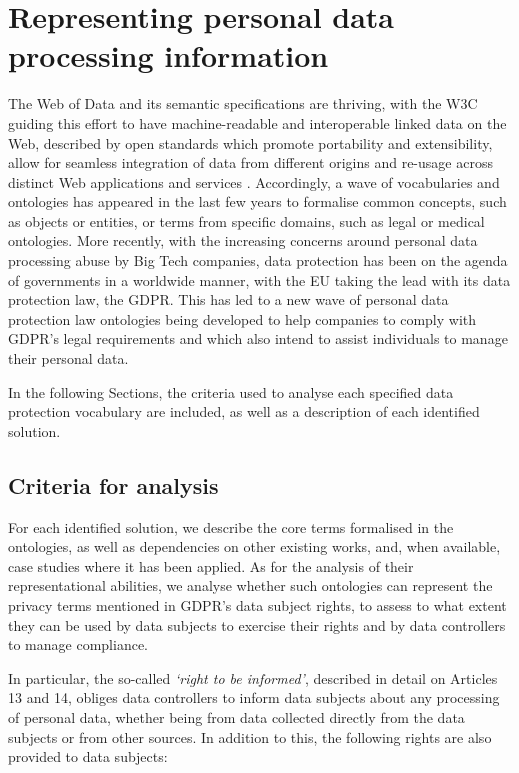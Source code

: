 \section{Representing personal data processing information}
\label{sec:sota_vocabularies}

The Web of Data and its semantic specifications are thriving, with the W3C guiding this effort to have machine-readable and interoperable linked data on the Web, described by open standards which promote portability and extensibility, allow for seamless integration of data from different origins and re-usage across distinct Web applications and services \citep{berners-lee_semantic_2001}.
Accordingly, a wave of vocabularies and ontologies has appeared in the last few years to formalise common concepts, such as objects or entities, or terms from specific domains, such as legal or medical ontologies.
More recently, with the increasing concerns around personal data processing abuse by Big Tech companies, data protection has been on the agenda of governments in a worldwide manner, with the EU taking the lead with its data protection law, the GDPR.
This has led to a new wave of personal data protection law ontologies being developed to help companies to comply with GDPR's legal requirements and which also intend to assist individuals to manage their personal data.

In the following Sections, the criteria used to analyse each specified data protection vocabulary are included, as well as a description of each identified solution.

\subsection{Criteria for analysis}
\label{sec:sota_vocabularies_criteria}

For each identified solution, we describe the core terms formalised in the ontologies, as well as dependencies on other existing works, and, when available, case studies where it has been applied.
As for the analysis of their representational abilities, we analyse whether such ontologies can represent the privacy terms mentioned in GDPR's data subject rights, to assess to what extent they can be used by data subjects to exercise their rights and by data controllers to manage compliance.

In particular, the so-called \textit{`right to be informed'}, described in detail on Articles 13 and 14, obliges data controllers to inform data subjects about any processing of personal data, whether being from data collected directly from the data subjects or from other sources. In addition to this, the following rights are also provided to data subjects:

